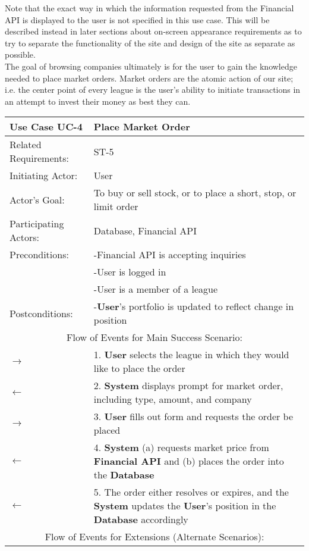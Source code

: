 Note that the exact way in which the information requested from the Financial API is displayed to the user is not specified in this use case. This will be described instead in later sections about on-screen appearance requirements as to try to separate the functionality of the site and design of the site as separate as possible. \\

The goal of browsing companies ultimately is for the user to gain the knowledge needed to place market orders. Market orders are the atomic action of our site; i.e. the center point of every league is the user's ability to initiate transactions in an attempt to invest their money as best they can. \\

\begin{centering}
\renewcommand\arraystretch{1.3} %
\begin{longtable}{|p{1.2in} p{5in}|}
\hline
\bfseries{\color{color1}Use Case UC-4} & \bfseries{\color{color1}Place Market Order} \\
\hline
Related Requirements: & ST-5 \\ 
Initiating Actor:     & User \\
Actor's Goal:         & To buy or sell stock, or to place a short, stop, or limit order \\
Participating Actors:  & Database, Financial API \\
Preconditions:        & -Financial API is accepting inquiries \\
 & -User is logged in \\
 & -User is a member of a league \\
Postconditions:       & -\textbf{User}'s portfolio is updated to reflect change in position \\
\hline
\multicolumn{2}{|c|}{\color{color1}Flow of Events for Main Success Scenario:}\\
\hline
$\rightarrow$ & 1. \textbf{User} selects the league in which they would like to place the order \\
$\leftarrow$ & 2. \textbf{System} displays prompt for market order, including type, amount, and company \\
$\rightarrow$ & 3. \textbf{User} fills out form and requests the order be placed \\
$\leftarrow$ & 4. \textbf{System} (a) requests market price from \textbf{Financial API} and (b) places the order into the \textbf{Database} \\
$\leftarrow$ & 5. The order either resolves or expires, and the \textbf{System} updates the \textbf{User}'s position in the \textbf{Database} accordingly \\
\hline
\multicolumn{2}{|c|}{\color{color1}Flow of Events for Extensions (Alternate Scenarios):} \\
\hline


\end{longtable}
\end{centering}
